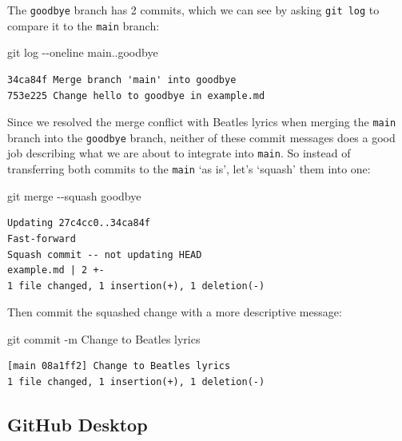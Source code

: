 \documentclass[
  letterpaper,
  DIV=11,
  numbers=noendperiod]{scrartcl}
\newenvironment{Shaded}{\begin{snugshade}}{\end{snugshade}}
\newcommand{\NormalTok}[1]{\textcolor[rgb]{0.00,0.23,0.31}{#1}}
\newcommand{\SpecialCharTok}[1]{\textcolor[rgb]{0.37,0.37,0.37}{#1}}
\newcommand{\StringTok}[1]{\textcolor[rgb]{0.13,0.47,0.30}{#1}}
\begin{document}
The \texttt{goodbye} branch has 2 commits, which we can see by asking
\texttt{git\ log} to compare it to the \texttt{main} branch:

\begin{Shaded}
\begin{Highlighting}[]
\NormalTok{git log }\SpecialCharTok{{-}{-}}\NormalTok{oneline main..goodbye}
\end{Highlighting}
\end{Shaded}

\begin{verbatim}
34ca84f Merge branch 'main' into goodbye
753e225 Change hello to goodbye in example.md
\end{verbatim}

Since we resolved the merge conflict with Beatles lyrics when merging
the \texttt{main} branch into the \texttt{goodbye} branch, neither of
these commit messages does a good job describing what we are about to
integrate into \texttt{main}. So instead of transferring both commits to
the \texttt{main} `as is', let's `squash' them into one:

\begin{Shaded}
\begin{Highlighting}[]
\NormalTok{git merge }\SpecialCharTok{{-}{-}}\NormalTok{squash goodbye}
\end{Highlighting}
\end{Shaded}

\begin{verbatim}
Updating 27c4cc0..34ca84f
Fast-forward
Squash commit -- not updating HEAD
example.md | 2 +-
1 file changed, 1 insertion(+), 1 deletion(-)
\end{verbatim}

Then commit the squashed change with a more descriptive message:

\begin{Shaded}
\begin{Highlighting}[]
\NormalTok{git commit }\SpecialCharTok{{-}}\NormalTok{m }\StringTok{\textquotesingle{}Change to Beatles lyrics\textquotesingle{}}
\end{Highlighting}
\end{Shaded}

\begin{verbatim}
[main 08a1ff2] Change to Beatles lyrics
1 file changed, 1 insertion(+), 1 deletion(-)
\end{verbatim}

\subsection{GitHub Desktop}
\end{document}

